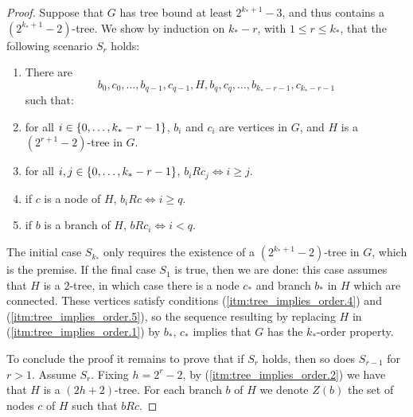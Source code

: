 \begin{theorem}
\begin{proof}
            Suppose that $G$ has tree bound at least $2^{k_*+1}-3$, and thus contains a $(2^{k_*+1}-2)$-tree.
            We show by induction on $k_*-r$, with $1 \leq r \leq k_*$, that the following scenario $S_r$ holds:
            \begin{enumerate}
                \item\label{itm:tree_implies_order.1} There are
                    \[
                        b_0, c_0, \dots, b_{q-1}, c_{q-1}, H, b_q, c_q, \dots, b_{k_*-r-1}, c_{k_*-r-1}
                    \]
                    such that:
                \item\label{itm:tree_implies_order.2} for all $i \in \left\{ 0, \dots, k_*-r-1 \right\}$, $b_i$ and $c_i$ are vertices in $G$,
                    and $H$ is a $(2^{r+1}-2)$-tree in $G$.
                \item\label{itm:tree_implies_order.3} for all $i,j \in \left\{ 0, \dots, k_*-r-1 \right\}$, $b_i R c_j \Leftrightarrow i \geq j$.
                \item\label{itm:tree_implies_order.4} if $c$ is a node of $H$, $b_i R c \Leftrightarrow i \geq q$.
                \item\label{itm:tree_implies_order.5} if $b$ is a branch of $H$, $b R c_i \Leftrightarrow i < q$.
            \end{enumerate}

            The initial case $S_{k_*}$ only requires the existence of a $(2^{k_*+1}-2)$-tree in $G$, which is the premise.
            If the final case $S_1$ is true, then we are done:
            this case assumes that $H$ is a $2$-tree, in which case there is a node $c_*$ and branch $b_*$ in $H$ which
            are connected.
            These vertices satisfy conditions (\ref{itm:tree_implies_order.4}) and (\ref{itm:tree_implies_order.5}), so
            the sequence resulting by replacing $H$ in (\ref{itm:tree_implies_order.1}) by $b_*$, $c_*$ implies that $G$
            has the $k_*$-order property.

            To conclude the proof it remains to prove that if $S_r$ holds, then so does $S_{r-1}$ for $r>1$.
            Assume $S_r$.
            Fixing $h = 2^r - 2$, by (\ref{itm:tree_implies_order.2}) we have that $H$ is a $(2h +2)$-tree.
            For each branch $b$ of $H$ we denote $Z(b)$ the set of nodes $c$ of $H$ such that $b R c$.


\end{proof}
\end{theorem}
